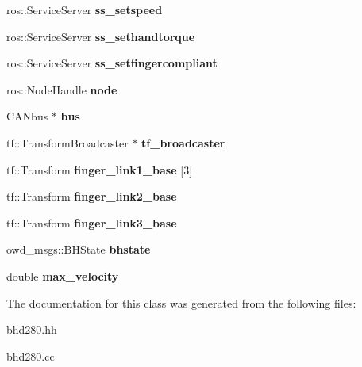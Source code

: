 \begin{DoxyCompactItemize}
\item 
\hypertarget{classBHD__280_a32effcce205600a1daf1c3c2dd386961}{ros\-::\-Service\-Server {\bfseries ss\-\_\-setspeed}}\label{classBHD__280_a32effcce205600a1daf1c3c2dd386961}

\item 
\hypertarget{classBHD__280_a62b9699022a3a3136df4988342d0a448}{ros\-::\-Service\-Server {\bfseries ss\-\_\-sethandtorque}}\label{classBHD__280_a62b9699022a3a3136df4988342d0a448}

\item 
\hypertarget{classBHD__280_a794307ea1d5f53abc81d7be6dfe114e7}{ros\-::\-Service\-Server {\bfseries ss\-\_\-setfingercompliant}}\label{classBHD__280_a794307ea1d5f53abc81d7be6dfe114e7}

\item 
\hypertarget{classBHD__280_ab30c913e55c21f4aa607a138f14b4079}{ros\-::\-Node\-Handle {\bfseries node}}\label{classBHD__280_ab30c913e55c21f4aa607a138f14b4079}

\item 
\hypertarget{classBHD__280_ab3ed741108a288454fa600fb050afc59}{C\-A\-Nbus $\ast$ {\bfseries bus}}\label{classBHD__280_ab3ed741108a288454fa600fb050afc59}

\item 
\hypertarget{classBHD__280_a721b42025b8b926315154c4a167c7d08}{tf\-::\-Transform\-Broadcaster $\ast$ {\bfseries tf\-\_\-broadcaster}}\label{classBHD__280_a721b42025b8b926315154c4a167c7d08}

\item 
\hypertarget{classBHD__280_a5746689a1056a92439a48700bdfeab4a}{tf\-::\-Transform {\bfseries finger\-\_\-link1\-\_\-base} \mbox{[}3\mbox{]}}\label{classBHD__280_a5746689a1056a92439a48700bdfeab4a}

\item 
\hypertarget{classBHD__280_a000ec83907ee86cf313924b2aa821d36}{tf\-::\-Transform {\bfseries finger\-\_\-link2\-\_\-base}}\label{classBHD__280_a000ec83907ee86cf313924b2aa821d36}

\item 
\hypertarget{classBHD__280_a7683e7bba27bc303b10a8dbeb1102074}{tf\-::\-Transform {\bfseries finger\-\_\-link3\-\_\-base}}\label{classBHD__280_a7683e7bba27bc303b10a8dbeb1102074}

\item 
\hypertarget{classBHD__280_a9b979009fe0ced0a57e958fd7176a6b6}{owd\-\_\-msgs\-::\-B\-H\-State {\bfseries bhstate}}\label{classBHD__280_a9b979009fe0ced0a57e958fd7176a6b6}

\item 
\hypertarget{classBHD__280_a5371f0e377093b551adde4920b737043}{double {\bfseries max\-\_\-velocity}}\label{classBHD__280_a5371f0e377093b551adde4920b737043}

\end{DoxyCompactItemize}


The documentation for this class was generated from the following files\-:\begin{DoxyCompactItemize}
\item 
bhd280.\-hh\item 
bhd280.\-cc\end{DoxyCompactItemize}
